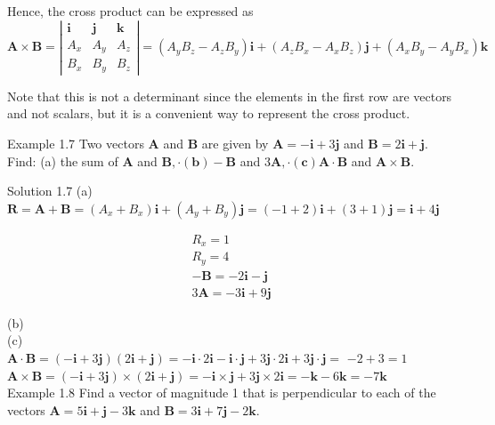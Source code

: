 \documentclass[10pt]{article}
\begin{document}
Hence, the cross product can be expressed as\\
$\mathbf{A} \times \mathbf{B}=\left|\begin{array}{lll}\mathbf{i} & \mathbf{j} & \mathbf{k} \\ A_{x} & A_{y} & A_{z} \\ B_{x} & B_{y} & B_{z}\end{array}\right|=\left(A_{y} B_{z}-A_{z} B_{y}\right) \mathbf{i}+\left(A_{z} B_{x}-A_{x} B_{z}\right) \mathbf{j}+\left(A_{x} B_{y}-A_{y} B_{x}\right) \mathbf{k}$

Note that this is not a determinant since the elements in the first row are vectors and not scalars, but it is a convenient way to represent the cross product.

Example 1.7 Two vectors $\mathbf{A}$ and $\mathbf{B}$ are given by $\mathbf{A}=-\mathbf{i}+3 \mathbf{j}$ and $\mathbf{B}=2 \mathbf{i}+\mathbf{j}$. Find: (a) the sum of $\mathbf{A}$ and $\mathbf{B}, \cdot(\mathbf{b})-\mathbf{B}$ and $3 \mathbf{A}, \cdot(\mathbf{c}) \mathbf{A} \cdot \mathbf{B}$ and $\mathbf{A} \times \mathbf{B}$.

Solution 1.7 (a)\\
$\mathbf{R}=\mathbf{A}+\mathbf{B}=\left(A_{x}+B_{x}\right) \mathbf{i}+\left(A_{y}+B_{y}\right) \mathbf{j}=(-1+2) \mathbf{i}+(3+1) \mathbf{j}=\mathbf{i}+4 \mathbf{j}$

$$
\begin{gathered}
R_{x}=1 \\
R_{y}=4 \\
-\mathbf{B}=-2 \mathbf{i}-\mathbf{j} \\
3 \mathbf{A}=-3 \mathbf{i}+9 \mathbf{j}
\end{gathered}
$$

(b)\\
(c)\\
$\mathbf{A} \cdot \mathbf{B}=(-\mathbf{i}+3 \mathbf{j})(2 \mathbf{i}+\mathbf{j})=-\mathbf{i} \cdot 2 \mathbf{i}-\mathbf{i} \cdot \mathbf{j}+3 \mathbf{j} \cdot 2 \mathbf{i}+3 \mathbf{j} \cdot \mathbf{j}=$ $-2+3=1$\\
$\mathbf{A} \times \mathbf{B}=(-\mathbf{i}+3 \mathbf{j}) \times(2 \mathbf{i}+\mathbf{j})=-\mathbf{i} \times \mathbf{j}+3 \mathbf{j} \times 2 \mathbf{i}=-\mathbf{k}-6 \mathbf{k}=-7 \mathbf{k}$\\
Example 1.8 Find a vector of magnitude 1 that is perpendicular to each of the vectors $\mathbf{A}=5 \mathbf{i}+\mathbf{j}-3 \mathbf{k}$ and $\mathbf{B}=3 \mathbf{i}+7 \mathbf{j}-2 \mathbf{k}$.
\end{document}
